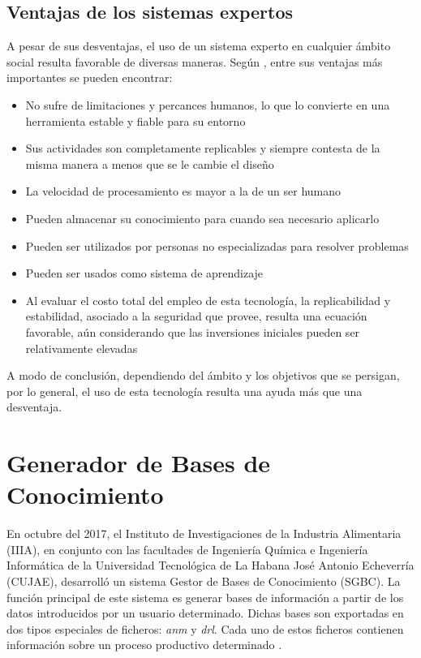 \subsection{Ventajas de los sistemas expertos}
A pesar de sus desventajas, el uso de un sistema experto en cualquier ámbito social resulta favorable de diversas maneras. Según \cite{Mitchell1990}, entre sus ventajas más importantes se pueden encontrar:

\begin{itemize}
\item No sufre de limitaciones y percances humanos, lo que lo convierte en una herramienta estable y fiable para su entorno
\item Sus actividades son completamente replicables y siempre contesta de la misma manera a menos que se le cambie el diseño
\item La velocidad de procesamiento es mayor a la de un ser humano
\item Pueden almacenar su conocimiento para cuando sea necesario aplicarlo
\item Pueden ser utilizados por personas no especializadas para resolver problemas
\item Pueden ser usados como sistema de aprendizaje
\item Al evaluar el costo total del empleo de esta tecnología, la replicabilidad y estabilidad, asociado a la seguridad que provee, resulta una ecuación favorable, aún considerando que las inversiones iniciales pueden ser
relativamente elevadas
\end{itemize}

A modo de conclusión, dependiendo del ámbito y los objetivos que se persigan, por lo general, el uso de esta tecnología resulta una ayuda más que una desventaja.


\section{Generador de Bases de Conocimiento}
En octubre del 2017, el Instituto de Investigaciones de la Industria Alimentaria (IIIA), en conjunto con las facultades de Ingeniería Química e Ingeniería Informática de la Universidad Tecnológica de La Habana José Antonio Echeverría (CUJAE), desarrolló un sistema Gestor de Bases de Conocimiento (SGBC). La función principal de este sistema es generar bases de información a partir de los datos introducidos por un usuario determinado. Dichas bases son exportadas en dos tipos especiales de ficheros: \textsl{anm} y \textsl{drl}. Cada uno de estos ficheros contienen información sobre un proceso productivo determinado \cite{Lemus2018}.

